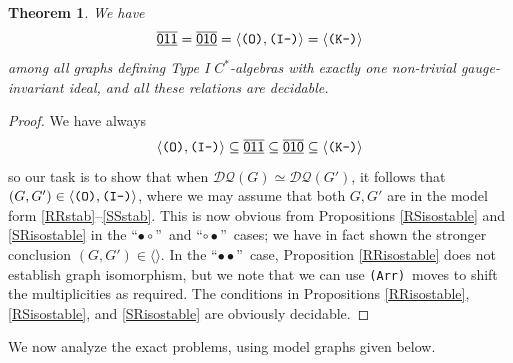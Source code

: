\documentclass[12pt]{amsbook}%
\newtheorem{theor}{Theorem}[section]
\theoremstyle{defin}
\theoremstyle{remark}
\numberwithin{equation}{chapter}
\numberwithin{theor}{section}
\newcommand{\xyzrel}[1]{\mbox{$\overline{\underline{\mathsf{ #1}}}$}}
\newcommand{\IIIm}{\mbox{\texttt{\textup{(I-)}}}}
\newcommand{\OOO}{\mbox{\texttt{\textup{(O)}}}}
\newcommand{\KKKm}{\mbox{\texttt{\textup{(K-)}}}}
\newcommand{\AAArr}{\mbox{\texttt{\textup{(Arr)}}}}
\newcommand{\DQ}{\mathcal{DQ}}
\newcommand{\RRc}{\mbox{``$\bullet\bullet$''}}
\newcommand{\RSc}{\mbox{``$\bullet\circ$''}}
\newcommand{\SRc}{\mbox{``$\circ\bullet$''}}
\begin{document}
\begin{theor}\label{oneidealstable}
We have
\[
\xyzrel{011}=\xyzrel{010}=\langle\OOO,\IIIm\rangle=\langle\KKKm\rangle
\]
among all graphs defining Type I $C^*$-algebras with exactly one non-trivial gauge-invariant ideal, and all these relations are decidable. %
\end{theor}



\begin{proof}
We have always
\[
\langle\OOO,\IIIm\rangle\subseteq \xyzrel{011}\subseteq \xyzrel{010}\subseteq \langle\KKKm\rangle
\]
so our task is to show that when $\DQ(G)\simeq \DQ(G')$, it follows that $(G,G')\in\langle\OOO,\IIIm\rangle$, where we may assume that both $G,G'$ are in the model form \eqref{RRstab}--\eqref{SSstab}. This is now obvious from Propositions \ref{RSisostable} and \ref{SRisostable} in the \RSc\ and \SRc\ cases; we have in fact shown the stronger conclusion $(G,G')\in\langle\rangle$. In the \RRc\ case, Proposition \ref{RRisostable} does not establish graph isomorphism, but we note that we can use \AAArr\ moves to shift the multiplicities as required. The conditions in Propositions \ref{RRisostable}, \ref{RSisostable}, and \ref{SRisostable} are obviously decidable.
\end{proof}

We now analyze the exact problems, using model graphs given below.
\end{document}
